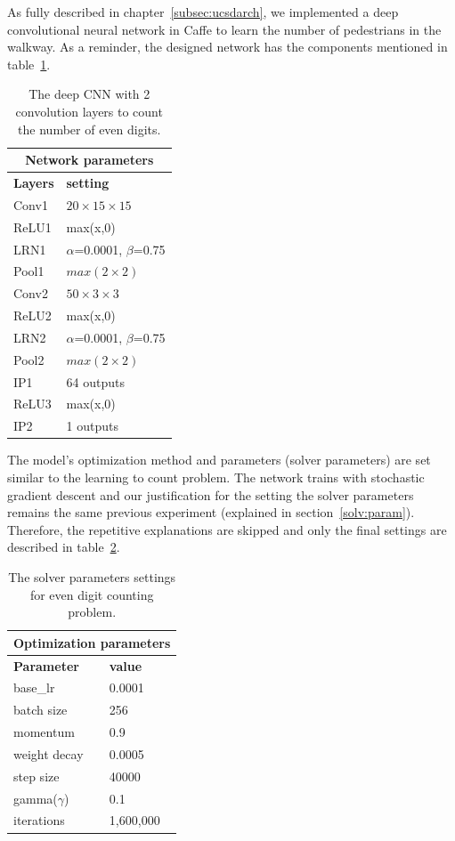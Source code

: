 As fully described in chapter~\ref{subsec:ucsdarch}, we implemented a deep convolutional neural network in Caffe to learn the number of pedestrians in the walkway. As a reminder, the designed network has the components mentioned in table~\ref{tab:ucsdnet}.  

\begin{table}[H]
	\centering
			\caption{The deep CNN with 2 convolution layers to count the number of even digits.}
	\begin{tabular}{ |p{2cm}|p{2cm}| }
	\hline 
	\multicolumn{2}{|c|}{\textbf{Network parameters}} \\
	\hline
	\hline
	\textbf{Layers} & \textbf{setting }\\
	\hline
	Conv1 & $20\times15\times15$\\
	\hline
	ReLU1 & max(x,0)  \\
	\hline
	LRN1 & $\alpha$=0.0001, $\beta$=0.75\\
	\hline
	Pool1    & $max(2\times2)$ \\
	\hline
	Conv2 & $50\times3\times3$\\
	\hline
	ReLU2 & max(x,0)  \\
	\hline
	LRN2 & $\alpha$=0.0001, $\beta$=0.75\\
	\hline
	Pool2    & $max(2\times2)$ \\
	\hline
	IP1 & 64 outputs \\
	\hline
	ReLU3 & max(x,0)  \\
	\hline
	IP2 & 1 outputs \\
	\hline
	\end{tabular}
		\label{tab:ucsdnet}
\end{table}

The model's optimization method and parameters (solver parameters) are set similar to the learning to count problem. The network trains with stochastic gradient descent and our justification for the setting the solver parameters remains the same previous experiment (explained in section~\ref{solv:param}). Therefore, the repetitive explanations are skipped and only the final settings are described in table~\ref{tab:solvparam}.

\begin{table}[H]
	\centering
			\caption{The solver parameters settings for even digit counting problem.}
	\begin{tabular}{ |p{2cm}|p{2cm}| }
	\hline 
	\multicolumn{2}{|c|}{\textbf{Optimization parameters}} \\
	\hline
	\hline
	\textbf{Parameter} & \textbf{value}\\
	\hline
	base\_lr & 0.0001\\
	\hline
	batch size & 256\\
	\hline
	momentum & 0.9  \\
	\hline
	weight decay & 0.0005\\
	\hline
	step size   & 40000 \\
	\hline
	gamma($\gamma$) & 0.1\\
	\hline
	iterations & 1,600,000\\
	\hline
	\end{tabular}

		\label{tab:solvparam}
\end{table}

